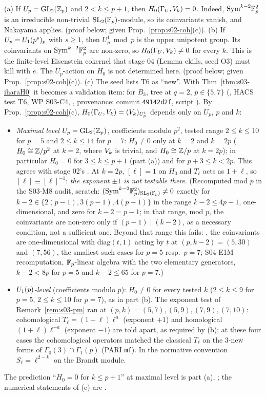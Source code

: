 \begin{remark}\label{rem:s03-T6}
(a) If $U_p=\mathrm{GL}_2(\mathbb{Z}_p)$ and $2<k\le p+1$, then $H_0(\Gamma_U,V_k)=0$. Indeed, $\mathrm{Sym}^{k-2}\mathbb{F}_p^2$ is an irreducible non-trivial
$\mathrm{SL}_2(\mathbb{F}_p)$-module, so its coinvariants vanish, and Nakayama applies. \stpmc{} (proof below; given Prop.~\ref{prop:s02-coh}(c)).
(b) If $U_p=U_1(p^s)_p$ with $s\ge1$, then $U^1_p\bmod p$ is the upper unipotent group. Its coinvariants on $\mathrm{Sym}^{k-2}\mathbb{F}_p^2$ are
non-zero, so $H_0(\Gamma_U,V_k)\ne0$ for every $k$. This is the finite-level Eisenstein cokernel that stage 04 (Lemma ekills, seed O3)
must kill with $e$. The $U_p$-action on $H_0$ is not determined here. \stpmc{} (proof below; given Prop.~\ref{prop:s02-coh}(c)).
(c) The seed lists T6 as ``new''. With Thm~\ref{thm:s03-iharaH0} it becomes a validation item: for $B_3$, tree at $q=2$, $p\in\{5,7\}$ (\stcomp{}, HACS test T6, WP S03-C4,
, provenance: commit \texttt{49142d2f}, script ).
By Prop.~\ref{prop:s02-coh}(c), $H_0(\Gamma_U,V_k)=(V_k)_{U^1_p}$ depends only on $U_p$, $p$ and $k$:
\begin{itemize}
\item \emph{Maximal level} $U_p=\mathrm{GL}_2(\mathbb{Z}_p)$, coefficients modulo $p^2$, tested range $2\le k\le10$ for $p=5$ and $2\le k\le14$ for $p=7$: $H_0\ne0$ only at $k=2$ and $k=2p$ ($H_0\cong\mathbb{Z}/p^2$ at $k=2$,
  where $V_k$ is trivial, and $H_0\cong\mathbb{Z}/p$ at $k=2p$); in particular $H_0=0$ for $3\le k\le p+1$ (part (a)) and for $p+3\le k<2p$. This agrees with stage 02's
  . At $k=2p$, $[\ell]=1$ on $H_0$ and $T_\ell$ acts as $1+\ell$, so $[\ell]\equiv[\ell]^{-1}$: \emph{the exponent
  $\pm1$ is not testable there}. (Recomputed mod $p$ in the S03-M8 audit, scratch: $(\mathrm{Sym}^{k-2}\mathbb{F}_p^2)_{\mathrm{SL}_2(\mathbb{F}_p)}\ne0$ exactly for $k-2\in\{2(p-1),3(p-1),4(p-1)\}$ in the range
  $k-2\le4p-1$, one-dimensional, and zero for $k-2=p-1$; in that range, mod $p$, the coinvariants are non-zero only if $(p-1)\mid(k-2)$, as a necessary condition, not a sufficient one. Beyond that range this fails: \stcomp{}, the coinvariants are one-dimensional with $\mathrm{diag}(t,1)$ acting by $t$ at $(p,k-2)=(5,30)$ and $(7,56)$, the smallest such cases for $p=5$ resp.\ $p=7$; S04-E1M recomputation, $\mathbb{F}_p$-linear algebra with the two elementary generators, $k-2<8p$ for $p=5$ and $k-2\le65$ for $p=7$.)
\item \emph{$U_1(p)$-level} (coefficients modulo $p$): $H_0\ne0$ for every tested $k$ ($2\le k\le9$ for $p=5$, $2\le k\le10$ for $p=7$), as in part (b). The exponent test of Remark~\ref{rem:s03-pm} ran at $(p,k)=(5,7),(5,9),(7,9),(7,10)$:
  cohomological $T_\ell=(1+\ell)\ell^{a}$ (exponent $+1$) and homological $(1+\ell)\ell^{-a}$ (exponent $-1$) are told apart, as required by (b); at these four cases the
  cohomological operators matched the classical $T_\ell$ on the $3$-new forms of $\Gamma_0(3)\cap\Gamma_1(p)$ (PARI \texttt{mf}). In the normative convention $S_\ell=\ell^{2-k}$ on the Brandt module.
\end{itemize}
The prediction ``$H_0=0$ for $k\le p+1$'' at maximal level is part (a), \stpmc; the numerical statements of (c) are \stcomp{}.
\end{remark}
